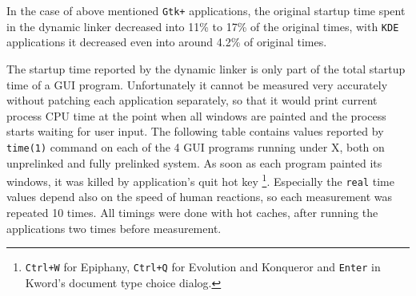 \documentclass[twoside]{article}
\def\tts#1{\texttt{\small #1}}
\begin{document}
In the case of above mentioned \tts{Gtk+} applications, the original startup
time spent in the dynamic linker decreased into 11\% to 17\% of the original
times, with \tts{KDE} applications it decreased even into around 4.2\% of original
times.

The startup time reported by the dynamic linker is only part of the total
startup time of a GUI program.  Unfortunately it cannot be measured very
accurately without patching each application separately, so that it would
print current process CPU time at the point when all windows are painted and
the process starts waiting for user input.  The following table contains
values reported by \tts{time(1)} command on each of the 4 GUI programs
running under X, both on unprelinked and fully prelinked system.
As soon as each program painted its windows, it was killed by
application's quit hot key
\footnote{\tts{Ctrl+W} for Epiphany, \tts{Ctrl+Q} for Evolution and
Konqueror and \tts{Enter} in Kword's document type choice dialog.}.
Especially the \tts{real} time values depend also on the speed of
human reactions, so each measurement was repeated 10 times.  All timings
were done with hot caches, after running the applications two times
before measurement.
\end{document}
